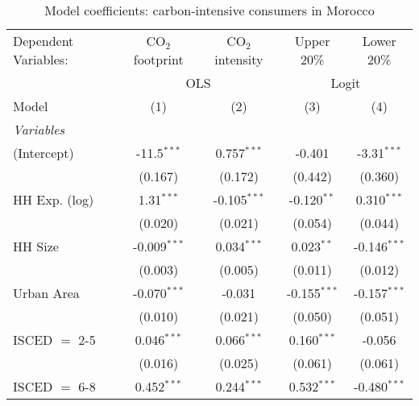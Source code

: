 
\begin{table}[htbp!]
   \centering
   \small
   \begin{adjustbox}{width = 1\textwidth, max height = 0.95\textheight, center}
      \begin{threeparttable}[b]
         \caption{\label{tab:Logit_1_MAR} Model coefficients: carbon-intensive consumers in Morocco}
         \begin{tabular}{lcccc}
            \tabularnewline \midrule \midrule
            Dependent Variables: & CO$_{2}$ footprint & CO$_{2}$ intensity & Upper 20\%     & Lower 20\%\\   
             & \multicolumn{2}{c}{OLS} & \multicolumn{2}{c}{Logit} \\ 
            Model                & (1)                & (2)                & (3)            & (4)\\  
            \midrule
            \emph{Variables}\\
            (Intercept)          & -11.5$^{***}$      & 0.757$^{***}$      & -0.401         & -3.31$^{***}$\\   
                                 & (0.167)            & (0.172)            & (0.442)        & (0.360)\\   
            HH Exp. (log)        & 1.31$^{***}$       & -0.105$^{***}$     & -0.120$^{**}$  & 0.310$^{***}$\\   
                                 & (0.020)            & (0.021)            & (0.054)        & (0.044)\\   
            HH Size              & -0.009$^{***}$     & 0.034$^{***}$      & 0.023$^{**}$   & -0.146$^{***}$\\   
                                 & (0.003)            & (0.005)            & (0.011)        & (0.012)\\   
            Urban Area           & -0.070$^{***}$     & -0.031             & -0.155$^{***}$ & -0.157$^{***}$\\   
                                 & (0.010)            & (0.021)            & (0.050)        & (0.051)\\   
            ISCED $=$ 2-5        & 0.046$^{***}$      & 0.066$^{***}$      & 0.160$^{***}$  & -0.056\\   
                                 & (0.016)            & (0.025)            & (0.061)        & (0.061)\\   
            ISCED $=$ 6-8        & 0.452$^{***}$      & 0.244$^{***}$      & 0.532$^{***}$  & -0.480$^{***}$\\   

\end{tabular}
\end{threeparttable}
\end{adjustbox}
\end{table}
